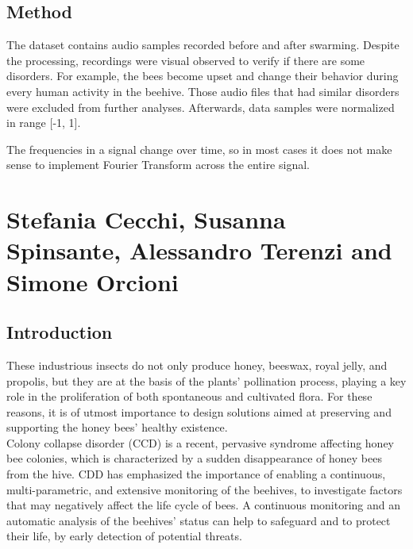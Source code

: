 \documentclass[12pt]{report}
\begin{document}
	\section{Method}
	
	The dataset contains audio samples recorded before and after swarming. Despite the processing, recordings were visual observed to verify if there are some disorders. For example, the bees become upset and change their behavior during every human activity in the beehive. Those audio files that had similar disorders were excluded from further analyses. Afterwards, data samples were normalized in range [-1, 1].
	
	\par The frequencies in a signal change over time, so in most cases it does not make sense to implement Fourier Transform across the entire signal.
	
	
	\chapter{Stefania Cecchi, Susanna Spinsante, Alessandro Terenzi and Simone Orcioni}
	
	\section{Introduction}
	
	These industrious insects do not only produce honey, beeswax, royal jelly, and propolis, but they are at the basis of the plants' pollination process, playing a key role in the proliferation of both spontaneous and cultivated flora. For these reasons, it is of utmost importance to design solutions aimed at preserving and supporting the honey bees' healthy existence.\\
	Colony collapse disorder (CCD) is a recent, pervasive syndrome affecting honey bee colonies, which is characterized by a sudden disappearance of honey bees from the hive. CDD has emphasized the importance of enabling a continuous, multi-parametric, and extensive monitoring of the beehives, to investigate factors that may negatively affect the life cycle of bees. A continuous monitoring and an automatic analysis of the beehives' status can help to safeguard and to protect their life, by early detection of potential threats.
	
\end{document}
